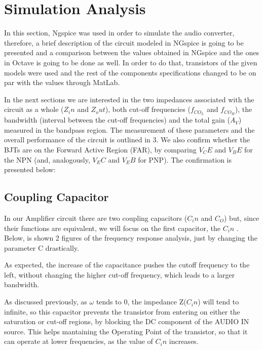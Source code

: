 \section{Simulation Analysis}
\label{sec:simulation}

In this section, Ngspice was used in order to simulate the audio converter, therefore, a brief description of the circuit modeled in NGspice is going to be presented and a comparison between the values obtained in NGspice and the ones in Octave is going to be done as well. In order to do that, transistors of the given models were used and the rest of the components specifications changed to be on par with the values through MatLab.

In the next sections we are interested in the two impedances associated with the circuit as a whole ($Z_in$ and $Z_out$), both cut-off frequencies ($f_{CO_L}$ and $f_{CO_H}$), the bandwidth (interval between the cut-off frequencies) and the total gain ($A_V$) measured in the bandpass region. The measurement of these parameters and the overall performance of the circuit is outlined in 3.
We also confirm whether the BJTs are on the Forward Active Region (FAR), by comparing $V_CE$ and $V_BE$ for the NPN (and, analogously, $V_EC$ and $V_EB$ for PNP).
The confirmation is presented below:


\subsection{Coupling Capacitor}

In our Amplifier circuit there are two coupling capacitors ($C_in$ and $C_O$) but, since their functions are equivalent, we will focus on the first capacitor, the $C_in$ . Below, is shown 2 figures of the frequency response analysis, just by changing the parameter C drastically.


As expected, the increase of the capacitance pushes the cutoff frequency to the left,
without changing the higher cut-off frequency, which leads to a larger bandwidth. \par
As discussed previously, as $\omega$ tends to 0, the impedance Z($C_in$) will tend to infinite, so this
capacitor prevents the transistor from entering on either the saturation or cut-off regions, by blocking the DC component of the AUDIO IN source. This helps mantaining the Operating Point of the transistor, so that it can operate at lower frequencies, as the value of $C_in$ increases.


